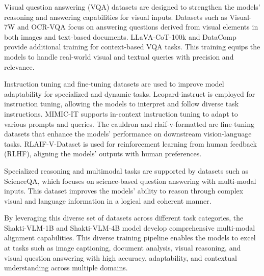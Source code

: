 \documentclass{article}
\begin{document}
Visual question answering (VQA) datasets are designed to strengthen the models' reasoning and answering capabilities for visual inputs. Datasets such as Visual-7W\cite{zhu2016visual7wgroundedquestionanswering} and OCR-VQA\cite{8978122ocrvqa} focus on answering questions derived from visual elements in both images and text-based documents. LLaVA-CoT-100k\cite{xu2024llavacotletvisionlanguage} and DataComp\cite{gadre2023datacompsearchgenerationmultimodal} provide additional training for context-based VQA tasks. This training equips the models to handle real-world visual and textual queries with precision and relevance. 

Instruction tuning and fine-tuning datasets are used to improve model adaptability for specialized and dynamic tasks. Leopard-instruct is employed for instruction tuning, allowing the models to interpret and follow diverse task instructions. MIMIC-IT\cite{li2023mimicitmultimodalincontextinstruction} supports in-context instruction tuning to adapt to various prompts and queries. The cauldron and rlaif-v-formatted\cite{yu2024rlaifv} are fine-tuning datasets that enhance the models' performance on downstream vision-language tasks. RLAIF-V-Dataset\cite{yu2024rlaifv} is used for reinforcement learning from human feedback (RLHF)\cite{rlhf}, aligning the models' outputs with human preferences. 

Specialized reasoning and multimodal tasks are supported by datasets such as ScienceQA\cite{lu2022learnscienceqa}, which focuses on science-based question answering with multi-modal inputs. This dataset improves the models' ability to reason through complex visual and language information in a logical and coherent manner. 

By leveraging this diverse set of datasets across different task categories, the Shakti-VLM-1B and Shakti-VLM-4B model develop comprehensive multi-modal alignment capabilities. This diverse training pipeline enables the models to excel at tasks such as image captioning, document analysis, visual reasoning, and visual question answering with high accuracy, adaptability, and contextual understanding across multiple domains. 
\end{document}
